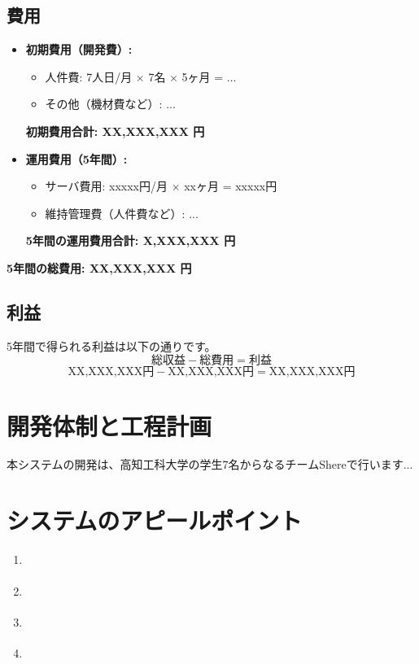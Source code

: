 \documentclass[a4j, 11pt, report]{jsarticle}
\begin{document}
\subsection{費用}
\begin{itemize}
    \item \textbf{初期費用（開発費）:}
        \begin{itemize}
            \item 人件費: 7人日/月 $\times$ 7名 $\times$ 5ヶ月 = ...
            \item その他（機材費など）: ...
        \end{itemize}
        \textbf{初期費用合計: XX,XXX,XXX 円}
    \item \textbf{運用費用（5年間）:}
        \begin{itemize}
            \item サーバ費用: xxxxx円/月 $\times$ xxヶ月 = xxxxx円
            \item 維持管理費（人件費など）: ...
        \end{itemize}
        \textbf{5年間の運用費用合計: X,XXX,XXX 円}
\end{itemize}
\textbf{5年間の総費用: XX,XXX,XXX 円}

\subsection{利益}
5年間で得られる利益は以下の通りです。
$$
\text{総収益} - \text{総費用} = \text{利益}
$$
$$
\text{XX,XXX,XXX円} - \text{XX,XXX,XXX円} = \text{XX,XXX,XXX円}
$$

\section{開発体制と工程計画}

本システムの開発は、高知工科大学の学生7名からなるチームShereで行います...



\section{システムのアピールポイント}
\begin{enumerate}
    \item \textbf{}
    \item \textbf{}
    \item \textbf{}
    \item \textbf{}
\end{enumerate}
\end{document}
